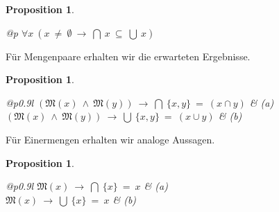 \documentclass[a4paper,german,10pt,twoside]{book}
\newtheorem{prop}[thm]{Proposition}
\theoremstyle{definition}
\theoremstyle{remark}
\begin{document}
\begin{prop}
\label{theorem:nonEmptySumProductSubSet} \hypertarget{theorem:nonEmptySumProductSubSet}{}
\mbox{}
\begin{longtable}{{@{\extracolsep{\fill}}p{\linewidth}}}
\centering $\forall x\ (x \ \neq  \ \emptyset\ \rightarrow \ \bigcap \ x \ \subseteq \ \bigcup \ x)$
\end{longtable}

\end{prop}




\par
F{\"u}r Mengenpaare erhalten wir die erwarteten Ergebnisse.

\begin{prop}
\label{theorem:setPairSetSumProduct} \hypertarget{theorem:setPairSetSumProduct}{}
\mbox{}
\begin{longtable}{{@{\extracolsep{\fill}}p{0.9\linewidth}l}}
\centering $(\mathfrak{M}(x)\ \land \ \mathfrak{M}(y))\ \rightarrow \ \bigcap \ \{ x, y \} \ =  \ (x \cap y)$ & \label{theorem:setPairSetSumProduct:a} \hypertarget{theorem:setPairSetSumProduct:a}{} \mbox{\emph{(a)}} \\
\centering $(\mathfrak{M}(x)\ \land \ \mathfrak{M}(y))\ \rightarrow \ \bigcup \ \{ x, y \} \ =  \ (x \cup y)$ & \label{theorem:setPairSetSumProduct:b} \hypertarget{theorem:setPairSetSumProduct:b}{} \mbox{\emph{(b)}} 
\end{longtable}

\end{prop}




\par
F{\"u}r Einermengen erhalten wir analoge Aussagen.

\begin{prop}
\label{theorem:singletonSetSumProduct} \hypertarget{theorem:singletonSetSumProduct}{}
\mbox{}
\begin{longtable}{{@{\extracolsep{\fill}}p{0.9\linewidth}l}}
\centering $\mathfrak{M}(x)\ \rightarrow \ \bigcap \ \{ x \} \ =  \ x$ & \label{theorem:singletonSetSumProduct:a} \hypertarget{theorem:singletonSetSumProduct:a}{} \mbox{\emph{(a)}} \\
\centering $\mathfrak{M}(x)\ \rightarrow \ \bigcup \ \{ x \} \ =  \ x$ & \label{theorem:singletonSetSumProduct:b} \hypertarget{theorem:singletonSetSumProduct:b}{} \mbox{\emph{(b)}} 
\end{longtable}

\end{prop}
\end{document}
